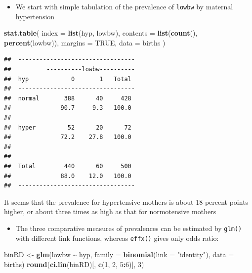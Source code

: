 \documentclass[
]{book}
\newenvironment{Shaded}{\begin{snugshade}}{\end{snugshade}}
\newcommand{\AttributeTok}[1]{\textcolor[rgb]{0.13,0.29,0.53}{#1}}
\newcommand{\ConstantTok}[1]{\textcolor[rgb]{0.56,0.35,0.01}{#1}}
\newcommand{\DecValTok}[1]{\textcolor[rgb]{0.00,0.00,0.81}{#1}}
\newcommand{\FunctionTok}[1]{\textcolor[rgb]{0.13,0.29,0.53}{\textbf{#1}}}
\newcommand{\NormalTok}[1]{#1}
\newcommand{\OtherTok}[1]{\textcolor[rgb]{0.56,0.35,0.01}{#1}}
\newcommand{\SpecialCharTok}[1]{\textcolor[rgb]{0.81,0.36,0.00}{\textbf{#1}}}
\newcommand{\StringTok}[1]{\textcolor[rgb]{0.31,0.60,0.02}{#1}}
\providecommand{\tightlist}{%
  \setlength{\itemsep}{0pt}\setlength{\parskip}{0pt}}
\begin{document}
\begin{itemize}
\tightlist
\item
  We start with simple tabulation
  of the prevalence of \texttt{lowbw} by maternal hypertension
\end{itemize}

\begin{Shaded}
\begin{Highlighting}[]
\FunctionTok{stat.table}\NormalTok{(}
  \AttributeTok{index =} \FunctionTok{list}\NormalTok{(hyp, lowbw),}
  \AttributeTok{contents =} \FunctionTok{list}\NormalTok{(}\FunctionTok{count}\NormalTok{(), }\FunctionTok{percent}\NormalTok{(lowbw)),}
  \AttributeTok{margins =} \ConstantTok{TRUE}\NormalTok{, }\AttributeTok{data =}\NormalTok{ births}
\NormalTok{)}
\end{Highlighting}
\end{Shaded}

\begin{verbatim}
##  --------------------------------- 
##          ----------lowbw---------- 
##  hyp            0       1   Total  
##  --------------------------------- 
##  normal       388      40     428  
##              90.7     9.3   100.0  
##                                    
##  hyper         52      20      72  
##              72.2    27.8   100.0  
##                                    
##                                    
##  Total        440      60     500  
##              88.0    12.0   100.0  
##  ---------------------------------
\end{verbatim}

It seems that the prevalence for hypertensive mothers
is about 18 percent points higher,
or about three times as high as that for normotensive mothers

\begin{itemize}
\tightlist
\item
  The three comparative measures of prevalences can be
  estimated by \texttt{glm()} with different link functions, whereas
  \texttt{effx()} gives only odds ratio:
\end{itemize}

\begin{Shaded}
\begin{Highlighting}[]
\NormalTok{binRD }\OtherTok{\textless{}{-}} \FunctionTok{glm}\NormalTok{(lowbw }\SpecialCharTok{\textasciitilde{}}\NormalTok{ hyp, }\AttributeTok{family =} \FunctionTok{binomial}\NormalTok{(}\AttributeTok{link =} \StringTok{"identity"}\NormalTok{), }\AttributeTok{data =}\NormalTok{ births)}
\FunctionTok{round}\NormalTok{(}\FunctionTok{ci.lin}\NormalTok{(binRD)[, }\FunctionTok{c}\NormalTok{(}\DecValTok{1}\NormalTok{, }\DecValTok{2}\NormalTok{, }\DecValTok{5}\SpecialCharTok{:}\DecValTok{6}\NormalTok{)], }\DecValTok{3}\NormalTok{)}
\end{Highlighting}
\end{Shaded}
\end{document}
